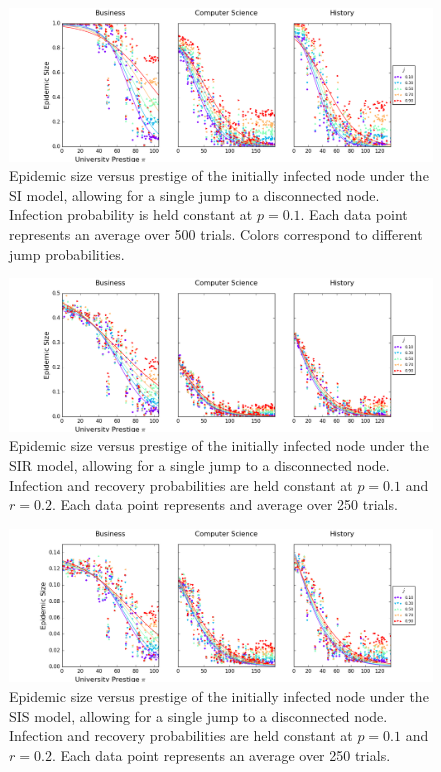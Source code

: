 \documentclass[%
 reprint,
 amsmath,amssymb,
 aps,
]{revtex4-1}
\begin{document}
\begin{figure}
	\centering
  \includegraphics[width=\textwidth]{figures/size-results-of-ALL-SI-random-hops.png}
  \caption{Epidemic size versus prestige of the initially infected node under the SI model, allowing for a single jump to a disconnected node. Infection probability is held constant at $p = 0.1$. Each data point represents an average over 500 trials. Colors correspond to different jump probabilities.}
   \label{SI-random-size}
\end{figure}

\begin{figure}
	\centering
  \includegraphics[width=\textwidth]{figures/size-results-of-ALL-SIR-random-hops.png}
  \caption{Epidemic size versus prestige of the initially infected node under the SIR model, allowing for a single jump to a disconnected node. Infection and recovery probabilities are held constant at $p = 0.1$ and $r = 0.2$. Each data point represents and average over 250 trials.}
   \label{SIR-random-size}
\end{figure}

\begin{figure}
	\centering
  \includegraphics[width=\textwidth]{figures/size-results-of-ALL-SIS-random-hops.png}
  \caption{Epidemic size versus prestige of the initially infected node under the SIS model, allowing for a single jump to a disconnected node. Infection and recovery probabilities are held constant at $p = 0.1$ and $r = 0.2$. Each data point represents an average over 250 trials.}
   \label{SIS-random-size}
\end{figure}
\end{document}
